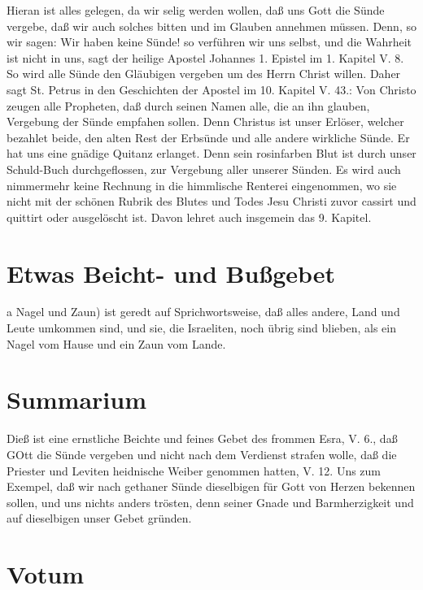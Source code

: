 Hieran ist alles gelegen, da wir selig werden wollen, daß uns Gott die Sünde vergebe, daß wir auch solches bitten und im Glauben annehmen müssen. Denn, so wir sagen: Wir haben keine Sünde! so verführen wir uns selbst, und die Wahrheit ist nicht in uns, sagt der heilige Apostel Johannes 1. Epistel im 1. Kapitel V. 8. So wird alle Sünde den Gläubigen vergeben um des Herrn Christ willen. Daher sagt St. Petrus in den Geschichten der Apostel im 10. Kapitel V. 43.: Von Christo zeugen alle Propheten, daß durch seinen Namen alle, die an ihn glauben, Vergebung der Sünde empfahen sollen. Denn Christus ist unser Erlöser, welcher bezahlet beide, den alten Rest der Erbsünde und alle andere wirkliche Sünde. Er hat uns eine gnädige Quitanz erlanget. Denn sein rosinfarben Blut ist durch unser Schuld-Buch durchgeflossen, zur Vergebung aller unserer Sünden. Es wird auch nimmermehr keine Rechnung in die himmlische Renterei eingenommen, wo sie nicht mit der schönen Rubrik des Blutes und Todes Jesu Christi zuvor cassirt und quittirt oder ausgelöscht ist. Davon lehret auch insgemein das 9. Kapitel.

\section{Etwas Beicht- und Bußgebet}

a Nagel und Zaun) ist geredt auf Sprichwortsweise, daß alles andere, Land und Leute umkommen sind, und sie, die Israeliten, noch übrig sind blieben, als ein Nagel vom Hause und ein Zaun vom Lande.


\section{Summarium}

Dieß ist eine ernstliche Beichte und feines Gebet des frommen Esra, V. 6., daß GOtt die Sünde vergeben und nicht nach dem Verdienst strafen wolle, daß die Priester und Leviten heidnische Weiber genommen hatten, V. 12. Uns zum Exempel, daß wir nach gethaner Sünde dieselbigen für Gott von Herzen bekennen sollen, und uns nichts anders trösten, denn seiner Gnade und Barmherzigkeit und auf dieselbigen unser Gebet gründen.

\section{Votum}

